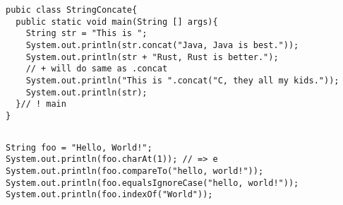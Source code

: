 \documentclass[
  11pt, %
  xcolor=dvipsnames
]{beamer}
\begin{document}
\begin{frame}[fragile]
\begin{columns}[c]
\begin{column}{0.9\textwidth}
			\begin{lstlisting}[style=Java]
pubic class StringConcate{
  public static void main(String [] args){
    String str = "This is ";
    System.out.println(str.concat("Java, Java is best."));
    System.out.println(str + "Rust, Rust is better.");
    // + will do same as .concat
    System.out.println("This is ".concat("C, they all my kids."));
    System.out.println(str);
  }// ! main
}
      \end{lstlisting}


		\end{column}
	\end{columns}

\end{frame}

\begin{frame}[fragile]

	\begin{columns}
		\begin{column}{0.9\textwidth}

			\begin{lstlisting}[style=Java]
String foo = "Hello, World!";
System.out.println(foo.charAt(1)); // => e
System.out.println(foo.compareTo("hello, world!"));
System.out.println(foo.equalsIgnoreCase("hello, world!"));
System.out.println(foo.indexOf("World"));
      \end{lstlisting}

		\end{column}
	\end{columns}
\end{frame}
\end{document}
